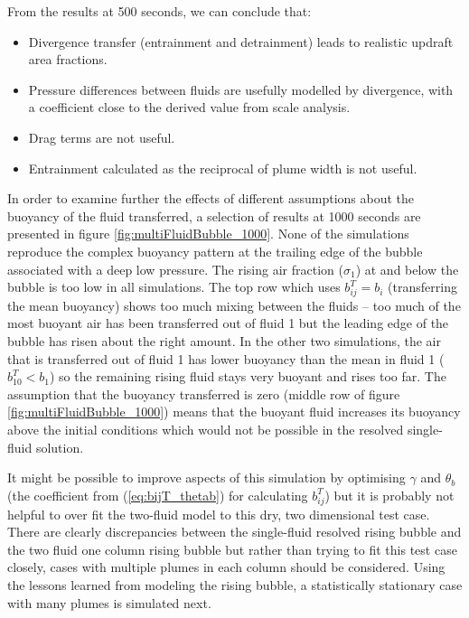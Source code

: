 \documentclass[draft]{agujournal2019}
\begin{document}
From the results at 500 seconds, we can conclude that:
\protect\begin{itemize}
\item Divergence transfer (entrainment and detrainment) leads to realistic updraft area fractions.
\item Pressure differences between fluids are usefully modelled by divergence, with a coefficient close to the derived value from scale analysis.
\item Drag terms are not useful.
\item Entrainment calculated as the reciprocal of plume width is not useful.
\protect\end{itemize}
In order to examine further the effects of different assumptions about the buoyancy of the fluid transferred, a selection of results at 1000 seconds are presented in figure {\protect\ref{fig:multiFluidBubble_1000}}. 
None of the simulations reproduce the complex buoyancy pattern at the trailing edge of the bubble associated with a deep low pressure. The rising air fraction ($\sigma_1$) at and below the bubble is too low in all simulations. The top row which uses $b_{ij}^T=b_i$ (transferring the mean buoyancy) shows too much mixing between the fluids -- too much of the most buoyant air has been transferred out of fluid 1 but the leading edge of the bubble has risen about the right amount. In the other two simulations, the air that is transferred out of fluid 1 has lower buoyancy than the mean in fluid 1 ($b_{10}^T<b_1$) so the remaining rising fluid stays very buoyant and rises too far. The assumption that the buoyancy transferred is zero (middle row of figure {\protect\ref{fig:multiFluidBubble_1000}}) means that the buoyant fluid increases its buoyancy above the initial conditions which would not be possible in the resolved single-fluid solution.

It might be possible to improve aspects of this simulation by optimising $\gamma$ and $\theta_b$ (the coefficient from  ({\protect\ref{eq:bijT_thetab}}) for calculating $b_{ij}^T$) but it is probably not helpful to over fit the two-fluid model to this dry, two dimensional test case.
There are clearly discrepancies between
the single-fluid resolved rising bubble and the two fluid one column rising bubble but rather than trying to fit this test case closely, cases with multiple plumes in each column should be considered. Using the lessons learned from modeling the rising bubble, a statistically stationary case with many plumes is simulated next.
\end{document}
